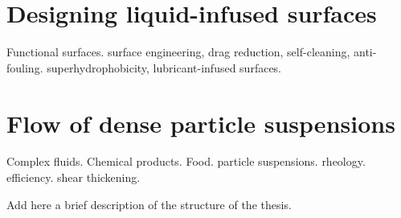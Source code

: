 \section{Designing liquid-infused surfaces}

Functional surfaces.
surface engineering,
drag reduction, self-cleaning, anti-fouling.
superhydrophobicity,
lubricant-infused surfaces.


\section{Flow of dense particle suspensions}

Complex fluids. Chemical products. Food.
particle suspensions.
rheology.
efficiency.
shear thickening.

\thesisstructure Add here a brief description of the structure of the thesis.



